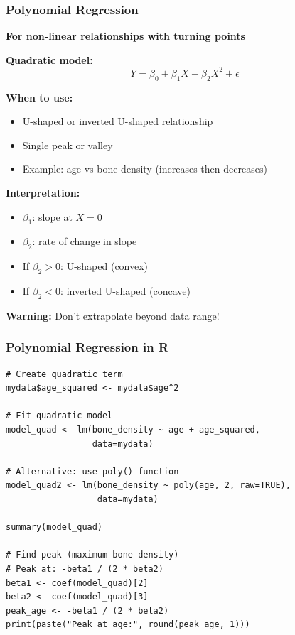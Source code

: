 \documentclass{beamer}
\begin{document}
\begin{frame}
\frametitle{Polynomial Regression}
\textbf{For non-linear relationships with turning points}

\vspace{0.3cm}
\textbf{Quadratic model:}
$$Y = \beta_0 + \beta_1 X + \beta_2 X^2 + \epsilon$$

\vspace{0.3cm}
\textbf{When to use:}
\begin{itemize}
\item U-shaped or inverted U-shaped relationship
\item Single peak or valley
\item Example: age vs bone density (increases then decreases)
\end{itemize}

\vspace{0.5cm}
\textbf{Interpretation:}
\begin{itemize}
\item $\beta_1$: slope at $X = 0$
\item $\beta_2$: rate of change in slope
\item If $\beta_2 > 0$: U-shaped (convex)
\item If $\beta_2 < 0$: inverted U-shaped (concave)
\end{itemize}

\vspace{0.3cm}
\textbf{Warning:} Don't extrapolate beyond data range!
\end{frame}

\begin{frame}[fragile]
\frametitle{Polynomial Regression in R}
\small
\begin{verbatim}
# Create quadratic term
mydata$age_squared <- mydata$age^2

# Fit quadratic model
model_quad <- lm(bone_density ~ age + age_squared,
                 data=mydata)

# Alternative: use poly() function
model_quad2 <- lm(bone_density ~ poly(age, 2, raw=TRUE),
                  data=mydata)

summary(model_quad)

# Find peak (maximum bone density)
# Peak at: -beta1 / (2 * beta2)
beta1 <- coef(model_quad)[2]
beta2 <- coef(model_quad)[3]
peak_age <- -beta1 / (2 * beta2)
print(paste("Peak at age:", round(peak_age, 1)))
\end{verbatim}
\end{frame}
\end{document}
